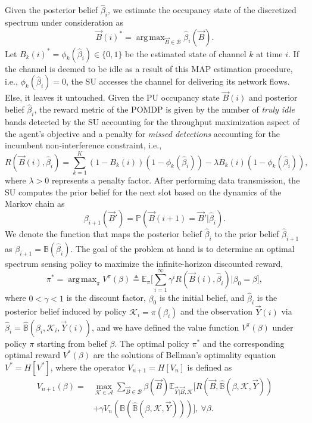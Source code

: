 \documentclass[10pt,twocolumn]{IEEEtran}
\DeclareMathOperator*{\argmax}{arg\,max}
\begin{document}
Given the posterior belief $\hat{\beta}_i$, we estimate the occupancy state of the discretized spectrum under consideration as
\begin{equation}
    \vec{B}(i)^{*} = \argmax_{\vec{B} {\in} \mathcal{B}} \hat{\beta}_{i}(\vec{B}).
\end{equation}
Let $B_{k}(i)^{*} = \phi_{k}(\hat{\beta}_{i}) {\in} \{0, 1\}$ be the estimated state of channel $k$ at time $i$. If the channel is deemed to be idle as a result of this MAP estimation procedure, i.e., $\phi_{k}(\hat{\beta}_{i}) = 0$, the SU accesses the channel for delivering its network flows. Else, it leaves it untouched. Given the PU occupancy state $\vec{B}(i)$ and posterior belief $\hat\beta_i$, the reward metric of the POMDP is given by the number of \emph{truly idle} bands detected by the SU accounting for the throughput maximization aspect of the agent's objective and a penalty for \emph{missed detections} accounting for the incumbent non-interference constraint, i.e.,
\begin{equation}
\nonumber
    R(\vec{B}(i), \hat{\beta}_i){=}\sum_{k=1}^{K} (1{-}B_k(i))(1{-}\phi_k(\hat{\beta}_{i})){-}\lambda B_k(i)(1 - \phi_k(\hat{\beta}_i)),
\end{equation}
where $\lambda{>}0$ represents a penalty factor. After performing data transmission, the SU computes the prior belief for the next slot based on the dynamics of the Markov chain as
\begin{equation}\label{13}
    \beta_{i+1}(\vec{B}') = \mathbb{P}(\vec{B}(i+1) = \vec{B}'|\hat{\beta}_{i}).
\end{equation}
We denote the function that maps the posterior belief $\hat\beta_i$ to the prior belief $\hat\beta_{i+1}$ as $\beta_{i+1}={\mathbb B}(\hat\beta_i)$.
The goal of the problem at hand is to determine an optimal spectrum sensing policy to maximize the infinite-horizon discounted reward,
\begin{equation}\label{14}
    \pi^{*}{=}\argmax_{\pi} V^{\pi}(\beta) \triangleq \mathbb{E}_{\pi} \Big[\sum_{i=1}^{\infty} \gamma^{i} R(\vec{B}(i), \hat{\beta}_i)|\beta_0 {=}\beta\Big],
\end{equation}
where $0{<}\gamma{<}1$ is the discount factor, $\beta_0$ is the initial belief, and $\hat\beta_i$ is the posterior belief induced by policy $\mathcal K_i{=}\pi(\beta_i)$ and the observation $\vec{Y}(i)$ via $\hat\beta_i{=}\hat{\mathbb B}(\beta_i, \mathcal K_i, \vec{Y}(i))$, and we have defined the value function $V^{\pi}(\beta)$ under policy $\pi$ starting from belief $\beta$.
The optimal policy $\pi^*$ and the corresponding optimal reward $V^*(\beta)$ are the solutions of Bellman's optimality equation $V^*{=}H[V^*]$, where the operator $V_{n+1}{=}H[V_n]$ is defined as
\begin{align}\label{16}
\nonumber
        V_{n+1}(\beta) = &\max_{\mathcal{K} {\in} \mathcal{A}} \sum_{\vec{B} {\in} \mathcal{B}} \beta(\vec{B}) \mathbb{E}_{\vec{Y}|\vec{B}, \mathcal{K}} \Big[R(\vec{B}, \hat{\mathbb{B}}(\beta, \mathcal{K}, \vec{Y}))\\ &+\gamma V_n(\mathbb{B}(\hat{\mathbb{B}}(\beta, \mathcal{K}, \vec{Y})))\Big],\ \forall \beta.
\end{align}
\end{document}
